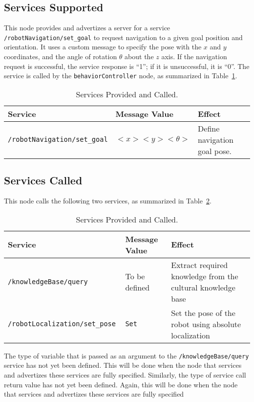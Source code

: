 \documentclass{CSSRforAfrica}
\begin{document}
\subsection*{Services Supported}
This node provides and advertizes a server for a service \verb|/robotNavigation/set_goal| to request navigation to a given goal position and orientation. It uses a custom message to specify the pose with the $x$ and $y$ coordinates, and the angle of rotation $\theta$ about the $z$ axis. If the navigation request is successful, the service response is “1”; if it is unsuccessful, it is “0”. The service is called by the \verb|behaviorController| node, as summarized in Table~\ref{tab:services supported}.

\begin{table}[H]
\centering
\caption{Services Provided and Called.}
\label{tab:services supported}
\begin{tabularx}{\textwidth}{|l|l|X|}
\hline
\textbf{Service} & \textbf{Message Value} & \textbf{Effect} \\ \hline
\verb|/robotNavigation/set_goal| & \(<x> <y> <\theta>\) & Define navigation goal pose. \\ \hline
\end{tabularx}
\end{table}

\subsection*{Services Called}
This node calls the following two services, as summarized in Table~\ref{tab:services called}.

\begin{table}[H]
\centering
\caption{Services Provided and Called.}
\label{tab:services called}
\begin{tabularx}{\textwidth}{|l|l|X|}
\hline
\textbf{Service} & \textbf{Message Value} & \textbf{Effect} \\ \hline
\verb|/knowledgeBase/query | & To be defined & Extract required knowledge from the cultural
knowledge base \\ \hline
\verb|/robotLocalization/set_pose  | & \verb|Set| & Set the pose of the robot using absolute localization \\ \hline
\end{tabularx}
\end{table}


\noindent The type of variable that is passed as an argument to the \verb|/knowledgeBase/query| service has not yet been defined. This will be done when the node that services and advertizes these services are fully specified. Similarly, the type of service call return value has not yet been defined. Again, this will be done when the node that services and advertizes these services are fully specified
\end{document}
